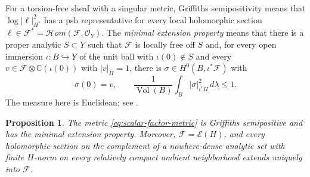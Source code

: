\documentclass[11pt,reqno]{amsart}
\numberwithin{equation}{section}
\newtheorem{proposition}[theorem]{Proposition}
\theoremstyle{definition}
\theoremstyle{remark}
\begin{document}
For a torsion-free sheaf with a singular metric, Griffiths
semipositivity means that $\log|\ell|_{H^*}^2$ has a psh
representative for every local holomorphic section
$\ell\in\mathcal F^*=\mathcal Hom(\mathcal F,\mathcal O_Y)$.
The \emph{minimal extension property} means that there is a proper
analytic $S\subset Y$ such that $\mathcal F$ is locally free off $S$
and, for every open immersion $\iota:B\hookrightarrow Y$ of the
unit ball with $\iota(0)\notin S$ and every $v\in\mathcal F\otimes\mathbb C(\iota(0))$
with $|v|_H=1$, there is $\sigma\in H^0(B,\iota^*\mathcal F)$ with
\[
 \sigma(0)=v,\qquad
 \frac1{\operatorname{Vol}(B)}\int_B|\sigma|_{\iota^*H}^2\,d\lambda\le1.
\]
The measure here is Euclidean; see \cite[Definition 1.2]{Tak24}.

\begin{proposition}\label{prop:scalar-mep}
The metric \eqref{eq:scalar-factor-metric} is Griffiths semipositive
and has the minimal extension property.  Moreover,
$\mathcal F=\mathscr E(H)$, and every holomorphic section on the
complement of a nowhere-dense analytic set with finite $H$-norm on every relatively
compact ambient neighborhood extends uniquely into $\mathcal F$.
\end{proposition}
\end{document}

